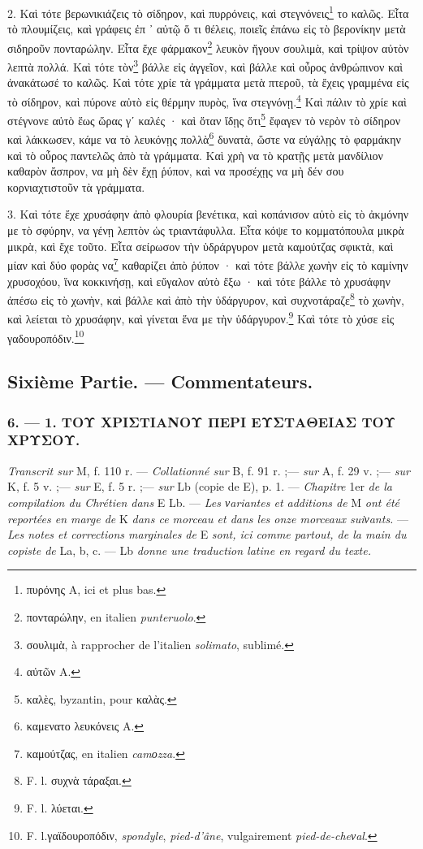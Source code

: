 \documentclass[a4paper, 11pt, oneside, polutonikogreek, french]{article}
\begin{document}
2. Καὶ τότε βερωνικιάζεις τὸ σίδηρον, καὶ πυρρόνεις, καὶ στεγνόνεις\footnote{πυρόνης A, ici et plus bas.} το καλῶς. Εἶτα τὸ πλουμίζεις, καὶ γράφεις ἐπ ᾽ αὐτῷ ὅ τι θέλεις, ποιεῖς ἐπάνω εἰς τὸ βερονίκην μετὰ σιδηροῦν πονταρώλην. Εἶτα ἔχε φάρμακον\footnote{πονταρώλην, en italien \emph{punteruolo}.} λευκὸν ἤγουν σουλιμὰ, καὶ τρίψον αὐτὸν λεπτὰ πολλά. Καὶ τότε τὸν\footnote{σουλιμὰ, à rapprocher de l'italien \emph{solimato}, sublimé.} βάλλε εἰς ἀγγεῖον, καὶ βάλλε καὶ οὖρος ἀνθρώπινον καὶ ἀνακάτωσέ το καλῶς. Καὶ τότε χρίε τὰ γράμματα μετὰ πτεροῦ, τὰ ἔχεις γραμμένα εἰς τὸ σίδηρον, καὶ πύρονε αὐτὸ εἰς θέρμην πυρὸς, ἵνα στεγνόνῃ.\footnote{αὐτῶν A.} Καὶ πάλιν τὸ χρίε καὶ στέγνονε αὐτὸ ἕως ὥρας γʹ καλές · καὶ ὅταν ἴδῃς ὅτι\footnote{καλὲς, byzantin, pour καλὰς.} ἔφαγεν τὸ νερὸν τὸ σίδηρον καὶ λάκκωσεν, κάμε να τὸ λευκόνῃς πολλὰ\footnote{καμενατο λευκόνεις A.} δυνατὰ, ὥστε να εὐγάλῃς τὸ φαρμάκην καὶ τὸ οὖρος παντελῶς ἀπὸ τὰ γράμματα. Καὶ χρὴ να τὸ κρατῇς μετὰ μανδίλιον καθαρὸν ἄσπρον, να μὴ δὲν ἔχῃ ῥύπον, καὶ να προσέχῃς να μὴ δέν σου κορνιαχτιστοῦν τὰ γράμματα.

3. Καὶ τότε ἔχε χρυσάφην ἀπὸ φλουρία βενέτικα, καὶ κοπάνισον αὐτὸ εἰς τὸ ἀκμόνην με τὸ σφύρην, να γένῃ λεπτὸν ὡς τριαντάφυλλα. Εἶτα κόψε το κομματόπουλα μικρὰ μικρὰ, καὶ ἔχε τοῦτο. Εἶτα σείρωσον τὴν ὑδράργυρον μετὰ καμούτζας σφικτὰ, καὶ μίαν καὶ δύο φορὰς να\footnote{καμούτζας, en italien \emph{camοzza}.} καθαρίζει ἀπὸ ῥύπον · καὶ τότε βάλλε χωνὴν εἰς τὸ καμίνην χρυσοχόου, ἵνα κοκκινήσῃ, καὶ εὔγαλον αὐτὸ ἔξω · καὶ τότε βάλλε τὸ χρυσάφην ἀπέσω εἰς τὸ χωνὴν, καὶ βάλλε καὶ ἀπὸ τὴν ὑδάργυρον, καὶ συχνοτάραζε\footnote{F. l. συχνὰ τάραξαι.} τὸ χωνὴν, καὶ λείεται τὸ χρυσάφην, καὶ γίνεται ἕνα με τὴν ὑδάργυρον.\footnote{F. l. λύεται.} Καὶ τότε τὸ χύσε εἰς γαδουροπόδιν.\footnote{F. l.γαϊδουροπόδιν, \emph{spondyle}, \emph{pied-d'âne}, vulgairement \emph{pied-de-cheνal}.}

\bigskip
\centerline{\EightStarTaper}
\centerline{\EightStarTaper\EightStarTaper}
\bigskip

\subsection{Sixième Partie. --- Commentateurs.}
\subsubsection{6. --- 1. ΤΟΥ ΧΡΙΣΤΙΑΝΟΥ ΠΕΡΙ ΕΥΣΤΑΘΕΙΑΣ ΤΟΥ ΧΡΥΣΟΥ.}

\emph{Transcrit sur} M, f. 110 r. --- \emph{Collationné sur} B, f. 91 r. ;--- \emph{sur} A, f. 29 v. ;--- \emph{sur} K, f. 5 v. ;--- \emph{sur} E, f. 5 r. ;--- \emph{sur} Lb (copie de E), p. 1. --- \emph{Chapitre} 1er \emph{de la compilation du Chrétien dans} E Lb. --- \emph{Les νariantes et additions de} M \emph{ont été reportées en marge de} K \emph{dans ce morceau et dans les onze morceaux suiνants.} --- \emph{Les notes et corrections marginales de} E \emph{sont, ici comme partout, de la main du copiste de} La, b, c. --- Lb \emph{donne une traduction latine en regard du texte.}
\end{document}
